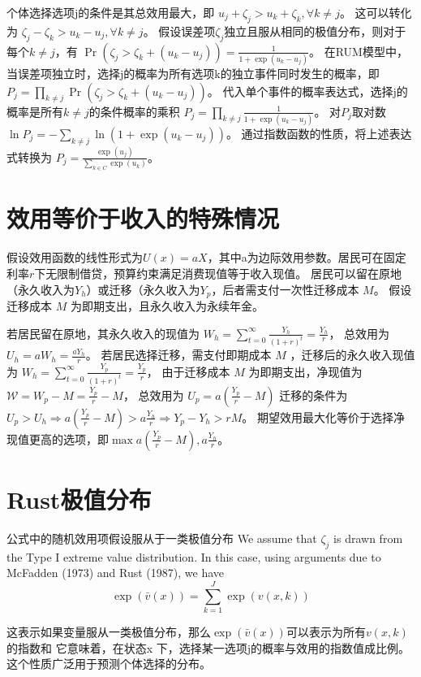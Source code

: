 \documentclass[a4paper,12pt,oneside, fontset=mac]{ctexbook} %
\begin{document}
个体选择选项j的条件是其总效用最大，即
$u_j + \zeta_j > u_k + \zeta_k, \forall k \neq j$。
这可以转化为
$\zeta_j - \zeta_k > u_k - u_j, \forall k \neq j$。
假设误差项$\zeta_j$独立且服从相同的极值分布，则对于每个$k \neq j$，有
$\Pr(\zeta_j > \zeta_k + (u_k - u_j)) = \frac{1}{1 + \exp(u_k - u_j)}$。
在RUM模型中，当误差项独立时，选择j的概率为所有选项k的独立事件同时发生的概率，即
$P_j = \prod\limits_{k \neq j} \Pr(\zeta_j > \zeta_k + (u_k - u_j))$。
代入单个事件的概率表达式，选择j的概率是所有$k \neq j$的条件概率的乘积
$P_j = \prod\limits_{k \neq j} \frac{1}{1 + \exp(u_k - u_j)}$。
对$P_j$取对数
$\ln P_j = - \sum_{k \neq j} \ln(1 + \exp(u_k - u_j))$。
通过指数函数的性质，将上述表达式转换为
$P_j = \frac{\exp(u_j)}{\sum\limits_{k \in C} \exp(u_k)}$。

\chapter{效用等价于收入的特殊情况}
假设效用函数的线性形式为$U(x)=a X$，其中a为边际效用参数。居民可在固定利率$r$下无限制借贷，预算约束满足消费现值等于收入现值。
居民可以留在原地（永久收入为$Y_h$）或迁移（永久收入为$Y_p$，后者需支付一次性迁移成本 $M$。
假设迁移成本 
$M$
为即期支出，且永久收入为永续年金。

若居民留在原地，其永久收入的现值为
$W_h = \sum\limits_{t=0}^\infty \frac{Y_h}{(1+r)^t}=\frac{Y_h}{r}$，
总效用为$U_h=a W_h = \frac{a Y_h}{r}$。
若居民选择迁移，需支付即期成本 
$M$
，迁移后的永久收入现值为
$W_h = \sum\limits_{t=0}^\infty \frac{Y_p}{(1+r)^t}=\frac{Y_p}{r}$，
由于迁移成本 
$M$
为即期支出，净现值为
$\mathcal{W}=W_p-M=\frac{Y_p}{r}-M$，
总效用为
$U_p=a(\frac{Y_p}{r}-M)$
迁移的条件为$U_p>U_h \Rightarrow a(\frac{Y_p}{r}-M) > a \frac{ Y_h}{r} \Rightarrow Y_p-Y_h > rM$。
期望效用最大化等价于选择净现值更高的选项，即$\max{a(\frac{Y_p}{r}-M), a \frac{ Y_h}{r}}$。

\chapter{Rust极值分布}
公式中的随机效用项假设服从于一类极值分布
We assume that $\zeta_j$ is drawn from the Type I extreme value distribution. In this case, using arguments due to McFadden (1973) and Rust (1987), we have
$$\exp\left(\bar{v}(x)\right) = \sum_{k=1}^J \exp\left(v(x, k)\right)$$

这表示如果变量服从一类极值分布，那么$\exp\left(\bar{v}(x)\right)$可以表示为所有$v(x, k)$的指数和
它意味着，在状态x 下，选择某一选项j的概率与效用的指数值成比例。
这个性质广泛用于预测个体选择的分布。
\end{document}
